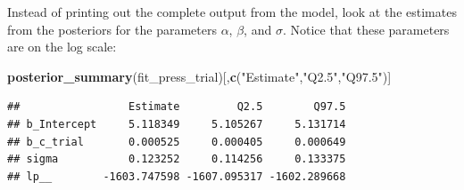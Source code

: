 \documentclass[12pt,]{krantz}
\newenvironment{Shaded}{\begin{snugshade}}{\end{snugshade}}
\newcommand{\KeywordTok}[1]{\textcolor[rgb]{0.13,0.29,0.53}{\textbf{#1}}}
\newcommand{\DataTypeTok}[1]{\textcolor[rgb]{0.13,0.29,0.53}{#1}}
\newcommand{\DecValTok}[1]{\textcolor[rgb]{0.00,0.00,0.81}{#1}}
\newcommand{\FloatTok}[1]{\textcolor[rgb]{0.00,0.00,0.81}{#1}}
\newcommand{\StringTok}[1]{\textcolor[rgb]{0.31,0.60,0.02}{#1}}
\newcommand{\OperatorTok}[1]{\textcolor[rgb]{0.81,0.36,0.00}{\textbf{#1}}}
\newcommand{\NormalTok}[1]{#1}
\theoremstyle{definition}
\theoremstyle{definition}
\theoremstyle{definition}
\theoremstyle{remark}
\begin{document}
\begin{Shaded}
\end{Shaded}

Instead of printing out the complete output from the model, look at the
estimates from the posteriors for the parameters \(\alpha\), \(\beta\),
and \(\sigma\). Notice that these parameters are on the log scale:

\begin{Shaded}
\begin{Highlighting}[]
\KeywordTok{posterior_summary}\NormalTok{(fit_press_trial)[,}\KeywordTok{c}\NormalTok{(}\StringTok{"Estimate"}\NormalTok{,}\StringTok{"Q2.5"}\NormalTok{,}\StringTok{"Q97.5"}\NormalTok{)]}
\end{Highlighting}
\end{Shaded}

\begin{verbatim}
##                 Estimate         Q2.5        Q97.5
## b_Intercept     5.118349     5.105267     5.131714
## b_c_trial       0.000525     0.000405     0.000649
## sigma           0.123252     0.114256     0.133375
## lp__        -1603.747598 -1607.095317 -1602.289668
\end{verbatim}
\end{document}
